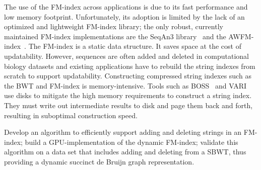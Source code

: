 
The use of the FM-index across applications is due to its fast performance and low memory footprint. Unfortunately, its adoption is  limited by the lack of an optimized and lightweight FM-index library; the only robust, currently maintained FM-index implementations are the SeqAn3 library~\cite{Reinert2017} and the AWFM-index~\cite{Anderson2021}. 
%
The FM-index is a static data structure. It saves space at the cost of updatability. However, sequences are often added and deleted in computational biology datasets and existing applications have to rebuild the string indexes from scratch to support updatability.
%
Constructing compressed string indexes such as the BWT and FM-index is memory-intensive. Tools such as BOSS~\cite{bowe2012succinct} and VARI~\cite{Muggli2019} use disks to mitigate the high memory requirements to construct a string index. They must write out  intermediate results to disk and page them back and forth, resulting in suboptimal construction speed.
%


\begin{rproblem}
Develop an algorithm to efficiently support adding and deleting strings in an FM-index; build a GPU-implementation of the dynamic FM-index; validate this algorithm on a data set that includes adding and deleting \kmers from a SBWT, thus providing a dynamic succinct de Bruijn graph representation. 
\label{rpob:dynamic-fmindex}
\end{rproblem}



